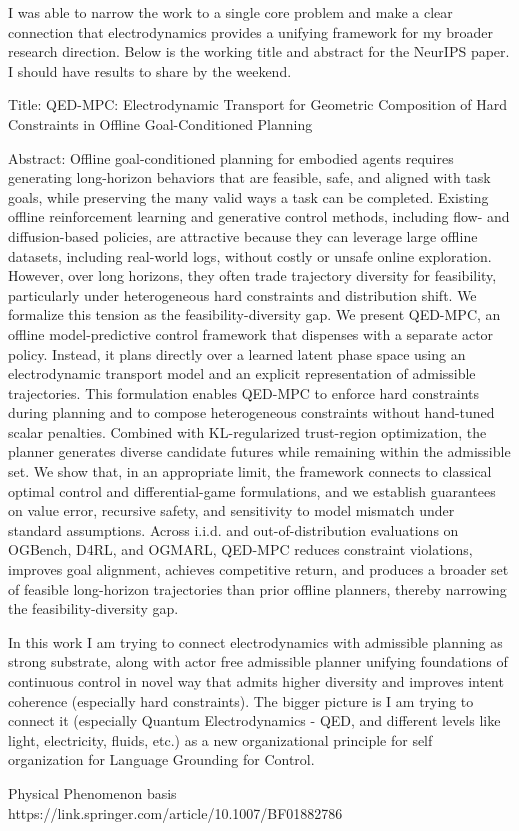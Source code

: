 I was able to narrow the work to a single core problem and make a clear connection that electrodynamics provides a unifying framework for my broader research direction. Below is the working title and abstract for the NeurIPS paper. I should have results to share by the weekend.

Title:
QED-MPC: Electrodynamic Transport for Geometric Composition of Hard Constraints in Offline Goal-Conditioned Planning

Abstract:
Offline goal-conditioned planning for embodied agents requires generating long-horizon behaviors that are feasible, safe, and aligned with task goals, while preserving the many valid ways a task can be completed. Existing offline reinforcement learning and generative control methods, including flow- and diffusion-based policies, are attractive because they can leverage large offline datasets, including real-world logs, without costly or unsafe online exploration. However, over long horizons, they often trade trajectory diversity for feasibility, particularly under heterogeneous hard constraints and distribution shift. We formalize this tension as the feasibility-diversity gap. We present QED-MPC, an offline model-predictive control framework that dispenses with a separate actor policy. Instead, it plans directly over a learned latent phase space using an electrodynamic transport model and an explicit representation of admissible trajectories. This formulation enables QED-MPC to enforce hard constraints during planning and to compose heterogeneous constraints without hand-tuned scalar penalties. Combined with KL-regularized trust-region optimization, the planner generates diverse candidate futures while remaining within the admissible set. We show that, in an appropriate limit, the framework connects to classical optimal control and differential-game formulations, and we establish guarantees on value error, recursive safety, and sensitivity to model mismatch under standard assumptions. Across i.i.d. and out-of-distribution evaluations on OGBench, D4RL, and OGMARL, QED-MPC reduces constraint violations, improves goal alignment, achieves competitive return, and produces a broader set of feasible long-horizon trajectories than prior offline planners, thereby narrowing the feasibility-diversity gap.

In this work I am trying to connect electrodynamics with admissible planning as strong substrate, along with actor free admissible planner unifying foundations of continuous control in novel way that admits higher diversity and improves intent coherence (especially hard constraints). The bigger picture is I am trying to connect it (especially Quantum Electrodynamics - QED, and different levels like light, electricity, fluids, etc.) as a new organizational principle for self organization for Language Grounding for Control.

Physical Phenomenon basis
https://link.springer.com/article/10.1007/BF01882786
